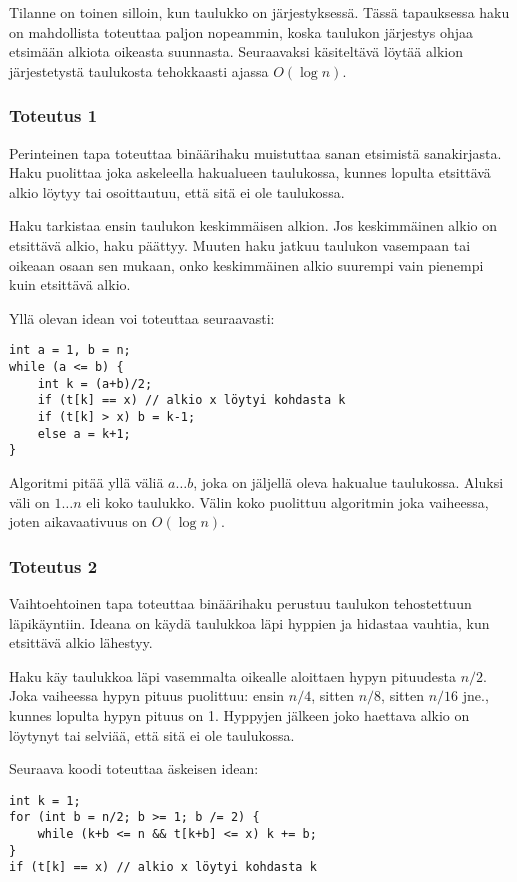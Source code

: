 Tilanne on toinen silloin, kun taulukko on
järjestyksessä.
Tässä tapauksessa haku on mahdollista toteuttaa
paljon nopeammin, koska taulukon järjestys
ohjaa etsimään alkiota oikeasta suunnasta.
Seuraavaksi käsiteltävä 
löytää alkion järjestetystä taulukosta
tehokkaasti ajassa $O(\log n)$.

\subsubsection{Toteutus 1}

Perinteinen tapa toteuttaa binäärihaku muistuttaa sanan etsimistä
sanakirjasta. Haku puolittaa joka askeleella hakualueen taulukossa,
kunnes lopulta etsittävä alkio löytyy tai osoittautuu,
että sitä ei ole taulukossa.

Haku tarkistaa ensin taulukon keskimmäisen alkion.
Jos keskimmäinen alkio on etsittävä alkio, haku päättyy.
Muuten haku jatkuu taulukon vasempaan tai oikeaan osaan sen mukaan,
onko keskimmäinen alkio suurempi vain pienempi kuin etsittävä alkio.

Yllä olevan idean voi toteuttaa seuraavasti:
\begin{lstlisting}
int a = 1, b = n;
while (a <= b) {
    int k = (a+b)/2;
    if (t[k] == x) // alkio x löytyi kohdasta k
    if (t[k] > x) b = k-1;
    else a = k+1;
}
\end{lstlisting}

Algoritmi pitää yllä väliä $a \ldots b$, joka on
jäljellä oleva hakualue taulukossa.
Aluksi väli on $1 \ldots n$ eli koko taulukko.
Välin koko puolittuu algoritmin joka vaiheessa,
joten aikavaativuus on $O(\log n)$.

\subsubsection{Toteutus 2}

Vaihtoehtoinen tapa toteuttaa binäärihaku
perustuu taulukon tehostettuun läpikäyntiin.
Ideana on käydä taulukkoa läpi hyppien
ja hidastaa vauhtia, kun etsittävä alkio lähestyy.

Haku käy taulukkoa läpi vasemmalta oikealle aloittaen
hypyn pituudesta $n/2$.
Joka vaiheessa hypyn pituus puolittuu:
ensin $n/4$, sitten $n/8$, sitten $n/16$ jne.,
kunnes lopulta hypyn pituus on 1.
Hyppyjen jälkeen joko haettava alkio on löytynyt
tai selviää, että sitä ei ole taulukossa.

Seuraava koodi toteuttaa äskeisen idean:
\begin{lstlisting}
int k = 1;
for (int b = n/2; b >= 1; b /= 2) {
    while (k+b <= n && t[k+b] <= x) k += b;
}
if (t[k] == x) // alkio x löytyi kohdasta k
\end{lstlisting}

